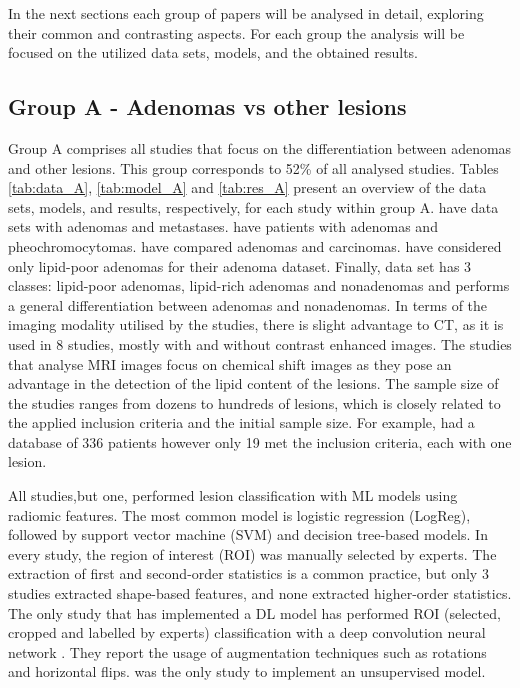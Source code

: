 \documentclass{article}
\begin{document}
In the next sections each group of papers will be analysed in detail, exploring their common and contrasting aspects. For each group the analysis will be focused on the utilized data sets, models, and the obtained results.

\subsection{Group A - Adenomas vs other lesions}

Group A comprises all studies that focus on the differentiation between adenomas
and other lesions. This group corresponds to 52\% of all analysed studies.
Tables \ref{tab:data_A}, \ref{tab:model_A} and \ref{tab:res_A} present an
overview of the data sets, models, and results, respectively, for each study
within group A. \cite{Schieda2017,Tu2018,Tu2020} have data sets with adenomas
and metastases. \cite{Yi20181,Yi2018, Liu2022,Liu2021} have patients with
adenomas and pheochromocytomas. \cite{Elmohr2019, Torresan2021, Ho2019} have
compared adenomas and carcinomas. \cite{Tu2020, Yi2018, Yi20181, Liu2022} have
considered only lipid-poor adenomas for their adenoma dataset. Finally,
\cite{Romeo2018} data set has 3 classes: lipid-poor adenomas, lipid-rich
adenomas and nonadenomas and \cite{Kusunoki2022} performs a general
differentiation between adenomas and nonadenomas. In terms of the imaging
modality utilised by the studies, there is slight advantage to CT, as it is used
in 8 studies, mostly with and without contrast enhanced images. The studies that
analyse MRI images focus on chemical shift images as they pose an advantage in
the detection of the lipid content of the lesions. The sample size of the
studies ranges from dozens to hundreds of lesions, which is closely related to
the applied inclusion criteria and the initial sample size. For example,
\cite{Torresan2021} had a database of 336 patients however only 19 met the
inclusion criteria, each with one lesion.

All studies,but one, performed lesion classification with ML models using
radiomic features. The most common model is logistic regression (LogReg),
followed by support vector machine (SVM) and decision tree-based models. In
every study, the region of interest (ROI) was manually selected by experts. The
extraction of first and second-order statistics is a common practice, but only 3
studies extracted shape-based features, and none extracted higher-order
statistics. The only study that has implemented a DL model has performed ROI
(selected, cropped and labelled by experts) classification with a deep
convolution neural network \cite{Kusunoki2022}. They report the usage of
augmentation techniques such as rotations and horizontal flips.
\cite{Torresan2021} was the only study to implement an unsupervised model.
\end{document}
